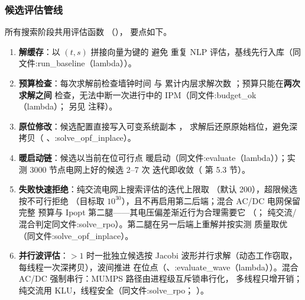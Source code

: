 \subsubsection*{候选评估管线}
所有搜索阶段共用评估函数 
（），
要点如下。
\begin{enumerate}
  \item \textbf{解缓存}：以 $(t,s)$ 拼接向量为键的  避免
        重复 NLP 评估，基线先行入库（同文件:run\_baseline（lambda））。
  \item \textbf{预算检查}：每次求解前检查墙钟时间  与
        累计内层求解次数 ；预算只能在\textbf{两次求解之间}
        检查，无法中断一次进行中的 IPM（同文件:budget\_ok（lambda）；
        另见 
        注释）。
  \item \textbf{原位修改}：候选配置直接写入可变系统副本 ，
        求解后还原原始档位，避免深拷贝（
        、:solve\_opf\_inplace）。
  \item \textbf{暖启动链}：候选以当前在位可行点 
        暖启动（同文件:evaluate（lambda））；实测 3000 节点电网上好的候选 2--7 次
        迭代即收敛（
        第 5.3 节）。
  \item \textbf{失败快速拒绝}：纯交流电网上搜索评估的迭代上限取
        （默认 200），超限候选按不可行拒绝
        （目标取 $10^{30}$），且不再启用第二后端；混合 AC/DC 电网保留完整
        预算与 Ipopt 第二腿——其电压偏差渐近行为合理需要它
        （；
        纯交流/混合判定同文件:solve\_rpo）。第二腿在另一后端上重解并按实测
        质量取优（同文件:solve\_opf\_inplace）。
  \item \textbf{并行波评估}：$>1$ 时一批独立候选按
        Jacobi 波形并行求解（动态工作窃取，每线程一次深拷贝），波间推进
        在位点（、:evaluate\_wave（lambda））。混合 AC/DC 强制串行：MUMPS 路径由进程级互斥锁串行化，
        多线程只增开销；纯交流用 KLU，线程安全（同文件:solve\_rpo；
        ）。
\end{enumerate}

